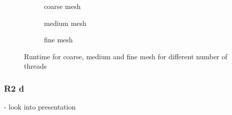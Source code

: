 \documentclass[a4paper, 11pt, oneside]{scrartcl}
\begin{document}
\begin{figure}[h!]
	\centering
	\begin{subfigure}{0.8\textwidth}
		\centering
		\resizebox{0.6\width}{!}{}
		\caption{\label{fig::Rcoarse} coarse mesh}
	\end{subfigure}
	\hfill
	\begin{subfigure}{0.8\textwidth}
		\centering
		\resizebox{0.6\width}{!}{}
		\caption{\label{fig::Rmedium} medium mesh}
	\end{subfigure}
	\hfill
	\begin{subfigure}{0.8\textwidth}
		\centering
		\resizebox{0.6\width}{!}{}
		\caption{\label{fig::Rfine} fine mesh}
	\end{subfigure}
	\caption{\label{fig::Runtime} Runtime for coarse, medium and fine mesh for different number of threads}
\end{figure}

%	

\subsubsection*{R2 d}
- look into presentation
\end{document}
